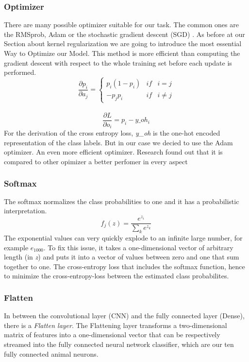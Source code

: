 \documentclass[journal]{IEEEtran}
\begin{document}
\subsubsection{Optimizer}
\noindent There are many possible optimizer suitable for our task. The common ones are the RMSprob, Adam or the stochastic gradient descent (SGD) \cite{RN1}. As before at our Section about kernel regularization we are going to introduce the most essential Way to Optimize our Model. This method is more efficient than computing the gradient descent with respect to the whole training set before each update is performed. 
\begin{equation}
\frac{\partial p_i}{\partial a_j}=\left\{\begin{matrix} p_i(1-p_i) & if & i=j\\ -p_j p_i & if & i\neq j \end{matrix}\right.
\end{equation} \\
\begin{equation}
\frac{\partial L}{\partial o_i}=p_i-y\_oh_i
\end{equation} 
For the derivation of the cross entropy loss, \textit{y\_oh} is the one-hot encoded representation of the class labels. But in our case we decied to use the Adam optimizer. An even more efficient optimizer. Research found out that it is compared to other opimizer a better perfomer in every aspect \cite{AutomotivePlatformsAutonomousDriving} \cite{Adam}
\subsubsection{Softmax}
\noindent The softmax normalizes the class probabilities to one and it has a probabilistic interpretation. 
\begin{equation}
f_{j}(z) = \frac{e^{z_{i}}}{\sum_{k} e^{z_{k}}}
\end{equation}
The exponential values can very quickly explode to an infinite large number, for example \(e_{1000}\). To fix this issue, it takes a one-dimensional vector of arbitrary length (in \textit{z}) and puts it into a vector of values between zero and one that sum together to one. The cross-entropy loss that includes the softmax function, hence to minimize the cross-entropy-loss between the estimated class probabilites. \\
\subsubsection{Flatten}
In between the convolutional layer (CNN) and the fully connected layer (Dense), there is a \textit{Flatten layer}. The Flattening layer transforms a two-dimensional matrix of features into a one-dimensional vector that can be respectively streamed into the fully connected neural network classifier, which are our ten fully connected animal neurons. \\
\end{document}
